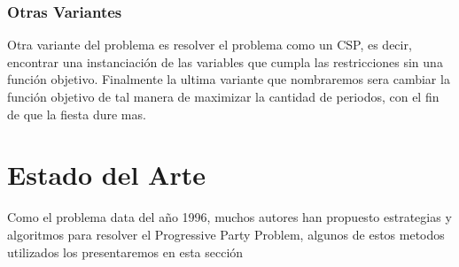 \documentclass[spanish, fleqn]{article}
\begin{document}
\subsubsection*{Otras Variantes}

Otra variante del problema es resolver el problema como un CSP, es decir, encontrar una instanciación de las variables que cumpla las restricciones sin una función objetivo. Finalmente la ultima variante que nombraremos sera cambiar la función objetivo de tal manera de maximizar la cantidad de periodos, con el fin de que la fiesta dure mas.

\section*{Estado del Arte}

Como el problema data del año 1996, muchos autores han propuesto estrategias y algoritmos para resolver el Progressive Party Problem, algunos de estos metodos utilizados los presentaremos en esta sección
\end{document}
